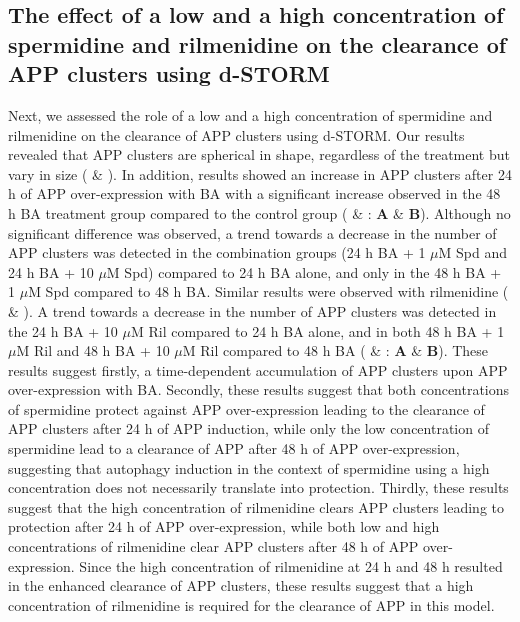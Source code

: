 \subsection{The effect of a low and a high concentration of spermidine and rilmenidine on the clearance of APP clusters using d-STORM}
Next, we assessed the role of a low and a high concentration of spermidine and rilmenidine on the clearance of APP clusters using d-STORM. Our results revealed that APP clusters are spherical in shape, regardless of the treatment but vary in size ( \& ). In addition, results showed an increase in APP clusters after 24 h of APP over-expression with BA with a significant increase observed in the 48 h BA treatment group compared to the control group ( \& : \textbf{A} \& \textbf{B}). Although no significant difference was observed, a trend towards a decrease in the number of APP clusters was detected in the combination groups (24 h BA + 1 $\mu$M Spd and 24 h BA + 10 $\mu$M Spd) compared to 24 h BA alone, and only in the 48 h BA + 1 $\mu$M Spd compared to 48 h BA. Similar results were observed with rilmenidine ( \& ). A trend towards a decrease in the number of APP clusters was detected in the 24 h BA + 10  $\mu$M Ril compared to 24 h BA alone, and in both 48 h BA + 1  $\mu$M Ril and 48 h BA + 10  $\mu$M Ril compared to 48 h BA ( \& : \textbf{A} \& \textbf{B}). These results suggest firstly, a time-dependent accumulation of APP clusters upon APP over-expression with BA. Secondly, these results suggest that both concentrations of spermidine protect against APP over-expression leading to the clearance of APP clusters after 24 h of APP induction, while only the low concentration of spermidine lead to a clearance of APP after 48 h of APP over-expression, suggesting that autophagy induction in the context of spermidine using a high concentration does not necessarily translate into protection. Thirdly, these results suggest that the high concentration of rilmenidine clears APP clusters leading to protection after 24 h of APP over-expression, while both low and high concentrations of rilmenidine clear APP clusters after 48 h of APP over-expression. Since the high concentration of rilmenidine at 24 h and 48 h resulted in the enhanced clearance of APP clusters, these results suggest that a high concentration of rilmenidine is required for the clearance of APP in this model. 

